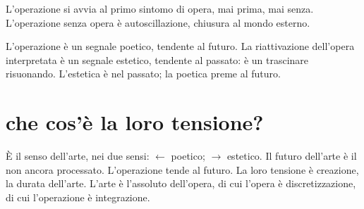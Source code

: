 L'operazione si avvia al primo sintomo di opera, mai prima, mai senza.
L'operazione senza opera è autoscillazione, chiusura al mondo esterno.

L'operazione è un segnale poetico, tendente al futuro. La riattivazione
dell'opera interpretata è un segnale estetico, tendente al passato: è un
trascinare risuonando. L'estetica è nel passato; la poetica preme al futuro.

\section*{che cos'è la loro tensione?}

\begin{figure}[htbp]
\begin{center}
\label{opera1}
\end{center}
\end{figure}

È il senso dell'arte, nei due sensi: $\leftarrow$ poetico; $\rightarrow$ estetico.
Il futuro dell'arte è il non ancora processato. L'operazione tende al futuro. La
loro tensione è creazione, la durata dell'arte. L'arte è l'assoluto dell'opera,
di cui l'opera è discretizzazione, di cui l'operazione è integrazione.
